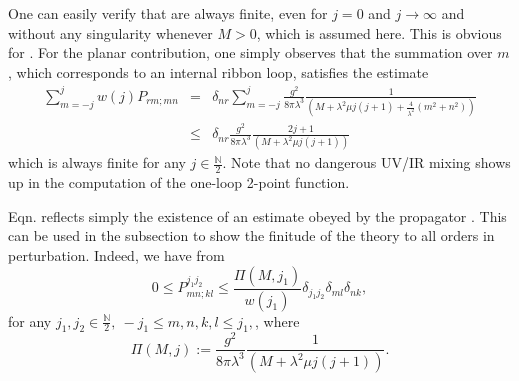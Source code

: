\documentclass[10pt]{book}
\theoremstyle{break}
\begin{document}
One can easily verify that %
are always finite, even for $j=0$ and $j\to\infty$ and without any singularity whenever $M>0$, which is assumed here. This is obvious for %
. For the planar contribution, one simply observes that the summation over $m$, which corresponds to an internal ribbon loop, satisfies the estimate%
%
\begin{eqnarray*}
\sum_{m=-j}^jw(j)P_{rm;mn}&=&\delta_{nr}\sum_{m=-j}^j\frac{g^2}{8\pi\lambda^3}\frac{1}{(M+\lambda^2\mu j(j+1)+\frac{4}{\lambda^2}(m^2+n^2))}\nonumber\\
&\le& \delta_{nr}\frac{g^2}{8\pi\lambda^3}\frac{2j+1}{(M+\lambda^2\mu j(j+1))} %
\end{eqnarray*}
%
which is always finite for any $j\in\frac{\mathbb{N}}{2}$. Note that no dangerous UV/IR mixing shows up in the computation of the one-loop 2-point function.\par %

Eqn.%
reflects simply the existence of an estimate obeyed by the propagator %
. This can be used in the subsection %
to show the finitude of the theory to all orders in perturbation. Indeed, we have from %
\begin{equation*}
0\le P^{j_1j_2}_{mn;kl}\le \frac{\Pi(M,j_1)}{w(j_1)}\delta_{j_1j_2}\delta_{ml}\delta_{nk}, %
\end{equation*}
for any $j_1,j_2\in\frac{\mathbb{N}}{2},\ -j_1\le m,n,k,l\le j_1,$, where
\begin{equation*}
\Pi(M,j) := \frac{g^2}{8\pi\lambda^3}\frac{1}{(M+\lambda^2\mu j(j+1))}.%
\end{equation*}
\end{document}

